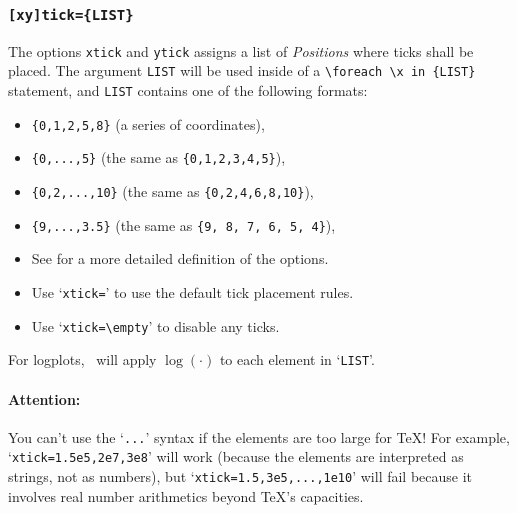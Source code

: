\subsubsection{\texttt{[xy]tick=\{LIST\}}}
The options \texttt{xtick} and \texttt{ytick} assigns a list of \emph{Positions} where ticks shall be placed. The argument \texttt{LIST} will be used inside of a \lstinline!\foreach \x in {LIST}! statement, and \texttt{LIST} contains one of the following formats:
\begin{itemize}
	\item \lstinline!{0,1,2,5,8}! (a series of coordinates),
	\item \lstinline!{0,...,5}! (the same as \lstinline!{0,1,2,3,4,5}!),
	\item \lstinline!{0,2,...,10}! (the same as \lstinline!{0,2,4,6,8,10}!),
	\item \lstinline!{9,...,3.5}! (the same as \lstinline!{9, 8, 7, 6, 5, 4}!),
	\item See \cite[Section~34]{tikz} for a more detailed definition of the options.
	\item Use `\texttt{xtick=}' to use the default tick placement rules.
	\item Use `\lstinline!xtick=\empty!' to disable any ticks.
\end{itemize}
For logplots, \PGFPlots\ will apply $\log(\cdot)$ to each element in `\texttt{LIST}'. 

\paragraph{Attention:} You can't use the `\texttt{...}' syntax if the elements are too large for \TeX! For example, `\texttt{xtick=1.5e5,2e7,3e8}' will work (because the elements are interpreted as strings, not as numbers), but `\texttt{xtick=1.5,3e5,...,1e10}' will fail because it involves real number arithmetics beyond \TeX's capacities.
\vspace*{0.3cm}

